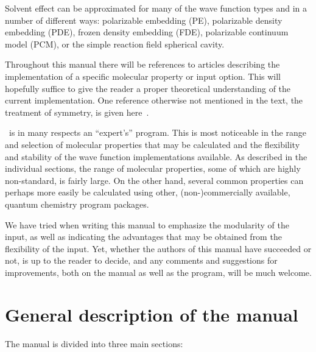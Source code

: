 Solvent effect can be approximated for many of the wave function types and in a number of different ways:
polarizable embedding (PE), polarizable density embedding (PDE),
frozen density embedding (FDE), polarizable continuum model (PCM), or the simple reaction field spherical cavity.


Throughout this manual there will be references to articles
describing the implementation of a specific molecular property or
input option. This will hopefully suffice to give the reader a proper
theoretical understanding of the current implementation. One
reference otherwise not mentioned in the text, the treatment of
symmetry, is given here~\cite{prttca69}.

\dalton\ is in many respects an ``expert's'' program. This is most
noticeable in the range and selection of molecular properties that may
be calculated and the flexibility and stability of the wave function
implementations available. As described in the individual sections, the range of
molecular properties, some of which are highly non-standard, is fairly
large. On the other hand, several common properties can perhaps more
easily be calculated using other, (non-)commercially available, quantum
chemistry program packages.

We have tried when writing this manual to emphasize the modularity of
the input, as well as indicating  the advantages that may be obtained from
the flexibility of the input. Yet, whether the authors of
this manual have succeeded or not, is up to the reader to decide, and
any comments and suggestions for improvements, both on the manual as
well as the program, will be much welcome.

\section{General description of the manual}

The manual is divided into three main sections:


